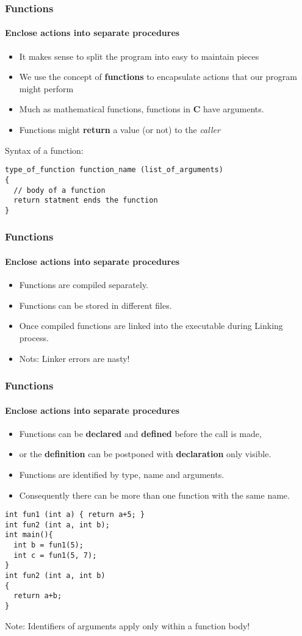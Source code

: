 \documentclass[10pt]{beamer}
\begin{document}
\begin{frame}[fragile]
\frametitle{Functions}
\framesubtitle{Enclose actions into separate procedures}

  \begin{itemize}
    \item It makes sense to split the program into easy to maintain pieces
    \item We use the concept of {\bf functions} to encapsulate actions that our program might perform
    \item Much as mathematical functions, functions in {\bf C} have arguments.
    \item Functions might {\bf return} a value (or not) to the {\it caller}
  \end{itemize}
  
  Syntax of a function:
    \begin{lstlisting}
type_of_function function_name (list_of_arguments)
{
  // body of a function
  return statment ends the function
}
    \end{lstlisting}
    
\end{frame}

\begin{frame}[fragile]
\frametitle{Functions}
\framesubtitle{Enclose actions into separate procedures}

    \begin{itemize}
      \item Functions are compiled separately.
      \item Functions can be stored in different files.
      \item Once compiled functions are linked into the executable during Linking process.
      \item Nots: Linker errors are nasty!       
    \end{itemize}
     
\end{frame}

\begin{frame}[fragile]
\frametitle{Functions}
\framesubtitle{Enclose actions into separate procedures}

    \begin{itemize}
      \item Functions can be {\bf declared} and {\bf defined} before the call is made,
      \item or the {\bf definition} can be postponed with {\bf declaration} only visible.
      \item Functions are identified by type, name and arguments.
      \item Consequently there can be more than one function with the same name.
    \end{itemize}
    
\begin{lstlisting}
int fun1 (int a) { return a+5; }
int fun2 (int a, int b);
int main(){
  int b = fun1(5);
  int c = fun1(5, 7);
}
int fun2 (int a, int b)
{
  return a+b;
}
\end{lstlisting}

Note: Identifiers of arguments apply only within a function body!
     
\end{frame}
\end{document}

